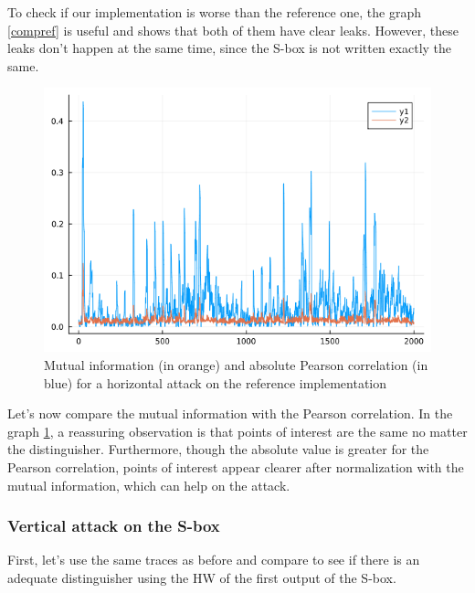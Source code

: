 \documentclass[a4paper,11pt,twocolumn]{article}
\begin{document}
	To check if our implementation is worse than the reference one, the graph \ref{compref} is useful and shows that both of them have clear leaks. However, these leaks don't happen at the same time, since the S-box is not written exactly the same. 
	
	\begin{figure}[H]
		\centering
		\includegraphics[scale=0.3]{corr_vs_MI_hHW}
		\caption{Mutual information (in orange) and absolute Pearson correlation (in blue) for a horizontal attack on the reference implementation}
		\label{corvsMI}
	\end{figure}
	
	Let's now compare the mutual information with the Pearson correlation. In the graph \ref{corvsMI}, a reassuring observation is that points of interest are the same no matter the distinguisher. Furthermore, though the absolute value is greater for the Pearson correlation, points of interest appear clearer after normalization with the mutual information, which can help on the attack.
	
	\subsubsection{Vertical attack on the S-box}
	First, let's use the same traces as before and compare to see if there is an adequate distinguisher using the HW of the first output of the S-box.
	
\end{document}
